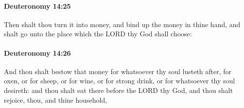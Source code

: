 		\paragraph{Deuteronomy 14:25} %
			\label{DEUTERONOMY-14-25}

			Then shalt thou turn it into money, and bind up the money in thine hand, and shalt go unto the place which the LORD thy God shall choose:


		\paragraph{Deuteronomy 14:26} %
			\label{DEUTERONOMY-14-26}

			And thou shalt bestow that money for whatsoever thy soul lusteth after, for oxen, or for sheep, or for wine, or for strong drink, or for whatsoever thy soul desireth: and thou shalt eat there before the LORD thy God, and thou shalt rejoice, thou, and thine household,

